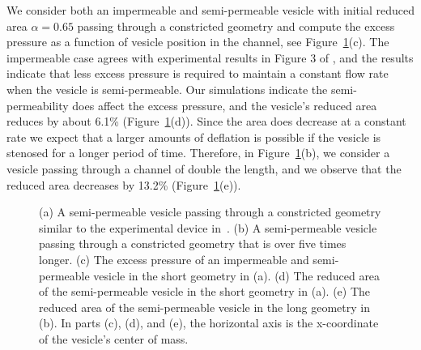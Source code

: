 \documentclass[9pt,twocolumn,twoside,lineno]{pnas-new}
\newif\ifTikz
\begin{document}
We consider both an impermeable and semi-permeable vesicle
with initial reduced area $\alpha = 0.65$ passing through a constricted
geometry and compute the excess pressure as a function of vesicle position in the channel, see Figure~\ref{fig:stenosisComposite}(c). 
The impermeable case agrees with experimental
results in Figure 3 of \cite{abk-fai-sto2006}, and the results indicate
that less excess pressure is required to maintain a constant flow rate when the
vesicle is semi-permeable. Our simulations indicate the
semi-permeability does affect the excess pressure, and the vesicle's
reduced area reduces by about 6.1\%
(Figure~\ref{fig:stenosisComposite}(d)). Since the area does decrease at
a constant rate we expect that a larger amounts of deflation is possible
if the vesicle is stenosed for a longer period of time. Therefore, in
Figure~\ref{fig:stenosisComposite}(b), we consider a vesicle passing
through a channel of double the length, and we observe that the reduced area
decreases by 13.2\% (Figure~\ref{fig:stenosisComposite}(e)).

\begin{figure}[htp]
  
  \caption{\label{fig:stenosisComposite} (a) A semi-permeable vesicle
  passing through a constricted geometry similar to the experimental
  device in~\cite{abk-fai-sto2006}. (b) A semi-permeable vesicle passing
  through a constricted geometry that is over five times longer. (c) The
  excess pressure of an impermeable and semi-permeable vesicle in the
  short geometry in (a). (d) The reduced area of the semi-permeable
  vesicle in the short geometry in (a). (e) The reduced area of the
  semi-permeable vesicle in the long geometry in (b). In parts (c), (d),
  and (e), the horizontal axis is the x-coordinate of the vesicle's
  center of mass.}
\end{figure}


\end{document}
